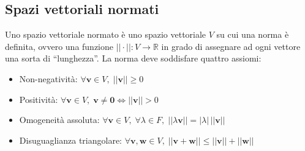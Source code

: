\documentclass{article}
\begin{document}
\vspace{10pt}
\subsection{Spazi vettoriali normati} \label{subsec:vsnormed}
    Uno spazio vettoriale normato è uno spazio vettoriale $V$ su cui una norma è definita, ovvero una funzione $||\cdot||: V \rightarrow \mathbb{R}$ in grado di assegnare 
    ad ogni vettore una sorta di ``lunghezza''. La norma deve soddisfare quattro assiomi:
    \begin{itemize}
        \item Non-negatività: $\forall \mathbf{v} \in V, \; ||\mathbf{v}|| \geq 0$
        \item Positività: $\forall \mathbf{v} \in V, \; \mathbf{v} \neq \mathbf{0} \iff ||\mathbf{v}|| > 0$
        \item Omogeneità assoluta: $\forall \mathbf{v} \in V, \; \forall \lambda \in F, \; ||\lambda\mathbf{v}|| = |\lambda|\,||\mathbf{v}||$
        \item Disuguaglianza triangolare: $\forall \mathbf{v}, \mathbf{w} \in V, \; ||\mathbf{v} + \mathbf{w}|| \leq ||\mathbf{v}|| + ||\mathbf{w}||$
    \end{itemize}
\end{document}

